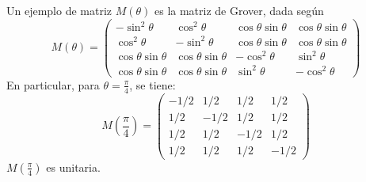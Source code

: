 \documentclass[12pt,a4paper]{article}
\begin{document}
Un ejemplo de matriz $M(\theta)$ es la matriz de Grover, dada según
\begin{equation*}
M(\theta) = 
\begin{pmatrix}
-\sin^2\theta & \cos^2\theta & \cos\theta\sin\theta & \cos\theta\sin\theta \\
\cos^2\theta & -\sin^2\theta & \cos\theta\sin\theta & \cos\theta\sin\theta \\
\cos\theta\sin\theta & \cos\theta\sin\theta & -\cos^2\theta & \sin^2\theta \\
\cos\theta\sin\theta & \cos\theta\sin\theta & \sin^2\theta & -\cos^2\theta
\end{pmatrix}
\end{equation*}
En particular, para $\theta=\frac{\pi}{4}$, se tiene:
\begin{equation*}
M(\frac{\pi}{4}) = 
\begin{pmatrix}
-1/2 & 1/2 & 1/2 & 1/2 \\
1/2 & -1/2 & 1/2 & 1/2 \\
1/2 & 1/2 & -1/2 & 1/2 \\
1/2 & 1/2 & 1/2 & -1/2
\end{pmatrix}
\end{equation*}
$M(\frac{\pi}{4})$ es unitaria.
\end{document}

